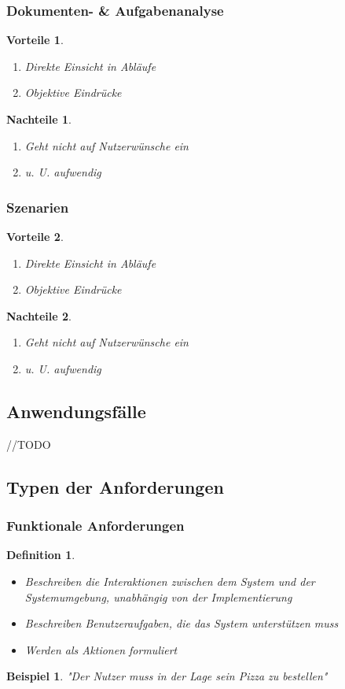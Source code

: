 \documentclass[a4paper]{article}
\theoremstyle{break}
\newtheorem{defi}{Definition}[section]
\newtheorem{ex}{Beispiel}[section]
\newtheorem{why}{Vorteile}[section]
\newtheorem{whynot}{Nachteile}[section]
\begin{document}
\subsubsection{Dokumenten- \& Aufgabenanalyse}
	\begin{why}
		\begin{enumerate}
			\item Direkte Einsicht in Abläufe
			\item Objektive Eindrücke
		\end{enumerate}
	\end{why}
	\begin{whynot}
		\begin{enumerate}
			\item Geht nicht auf Nutzerwünsche ein
			\item u. U. aufwendig
		\end{enumerate}
	\end{whynot}	
\subsubsection{Szenarien}
	\begin{why}
		\begin{enumerate}
			\item Direkte Einsicht in Abläufe
			\item Objektive Eindrücke
		\end{enumerate}
	\end{why}
	\begin{whynot}
		\begin{enumerate}
			\item Geht nicht auf Nutzerwünsche ein
			\item u. U. aufwendig
		\end{enumerate}
	\end{whynot}
\subsection{Anwendungsfälle}
//TODO
\subsection{Typen der Anforderungen}
\subsubsection{Funktionale Anforderungen}
\begin{defi}
	\begin{itemize}
		\item Beschreiben die Interaktionen zwischen dem System und der Systemumgebung, unabhängig von der Implementierung
		\item Beschreiben Benutzeraufgaben, die das System unterstützen muss
		\item Werden als Aktionen formuliert
	\end{itemize}
\end{defi}
\begin{ex}
	"Der Nutzer muss in der Lage sein Pizza zu bestellen"
\end{ex}
\end{document}
